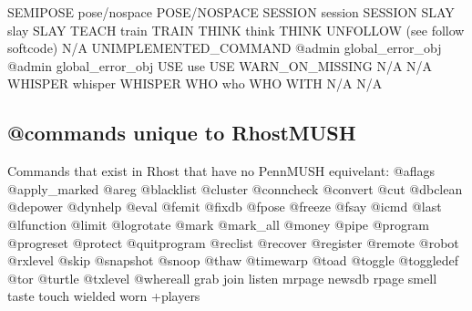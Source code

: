 \documentclass[letterpaper,10pt,english]{sphinxmanual}
\begin{document}
\begin{description}
SEMIPOSE                pose/nospace                   POSE/NOSPACE
SESSION                 session                        SESSION
SLAY                    slay                           SLAY
TEACH                   train                          TRAIN
THINK                   think                          THINK
UNFOLLOW                (see follow softcode)          N/A
UNIMPLEMENTED\_COMMAND   @admin global\_error\_obj        @admin global\_error\_obj
USE                     use                            USE
WARN\_ON\_MISSING         N/A                            N/A
WHISPER                 whisper                        WHISPER
WHO                     who                            WHO
WITH                    N/A                            N/A

\end{description}


\subsection{@commands unique to RhostMUSH}
\label{\detokenize{differences:commands-unique-to-rhostmush}}
\sphinxAtStartPar
Commands that exist in Rhost that have no PennMUSH equivelant:
@aflags                      @apply\_marked                 @areg
@blacklist                   @cluster                      @conncheck
@convert                     @cut                          @dbclean
@depower                     @dynhelp                      @eval
@femit                       @fixdb                        @fpose
@freeze                      @fsay                         @icmd
@last                        @lfunction                    @limit
@logrotate                   @mark                         @mark\_all
@money                       @pipe                         @program
@progreset                   @protect                      @quitprogram
@reclist                     @recover                      @register
@remote                      @robot                        @rxlevel
@skip                        @snapshot                     @snoop
@thaw                        @timewarp                     @toad
@toggle                      @toggledef                    @tor
@turtle                      @txlevel                      @whereall
grab                         join                          listen
mrpage                       newsdb                        rpage
smell                        taste                         touch
wielded                      worn                          +players
\end{document}
